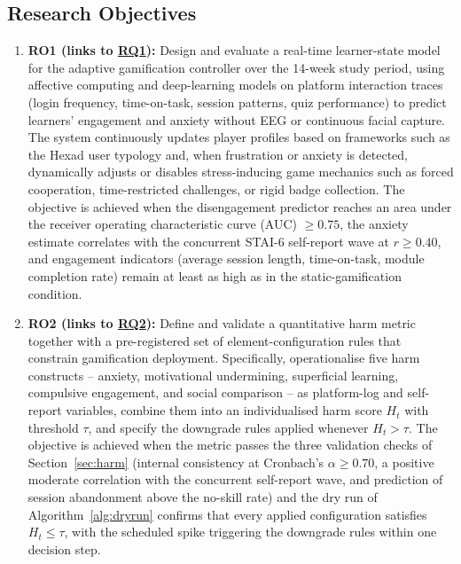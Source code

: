 \documentclass[12pt,a4paper]{article}
\DeclareRobustCommand{\rqlink}[1]{\texorpdfstring{\hyperref[rq:rq#1]{RQ#1}}{RQ#1}}
\begin{document}
\begin{justify}

\section{Research Objectives}

\begin{enumerate}
    \item \textbf{RO1 (links to \rqlink{1}):} Design and evaluate a real-time
    learner-state model for the adaptive gamification controller over the 14-week
    study period, using affective computing and deep-learning models on platform
    interaction traces (login frequency, time-on-task, session patterns, quiz
    performance) to predict learners' engagement and anxiety without EEG or
    continuous facial capture. The system continuously updates player profiles based
    on frameworks such as the Hexad user typology and, when frustration or anxiety is
    detected, dynamically adjusts or disables stress-inducing game mechanics such as
    forced cooperation, time-restricted challenges, or rigid badge collection. The
    objective is achieved when the disengagement predictor reaches an area under the
    receiver operating characteristic curve (AUC) $\ge 0.75$, the anxiety estimate
    correlates with the concurrent STAI-6 self-report wave at $r \ge 0.40$, and
    engagement indicators (average session length, time-on-task, module completion
    rate) remain at least as high as in the static-gamification condition.
    
    \item \textbf{RO2 (links to \rqlink{2}):} Define and validate a quantitative harm
    metric together with a pre-registered set of element-configuration rules that
    constrain gamification deployment. Specifically, operationalise five harm
    constructs -- anxiety, motivational undermining, superficial learning, compulsive
    engagement, and social comparison -- as platform-log and self-report variables,
    combine them into an individualised harm score $H_t$ with threshold $\tau$, and
    specify the downgrade rules applied whenever $H_t > \tau$. The objective is
    achieved when the metric passes the three validation checks of
    Section~\ref{sec:harm} (internal consistency at Cronbach's $\alpha \ge 0.70$, a
    positive moderate correlation with the concurrent self-report wave, and
    prediction of session abandonment above the no-skill rate) and the dry run of
    Algorithm~\ref{alg:dryrun} confirms that every applied configuration satisfies
    $H_t \le \tau$, with the scheduled spike triggering the downgrade rules within
    one decision step.
    

\end{enumerate}
\end{justify}
\end{document}

